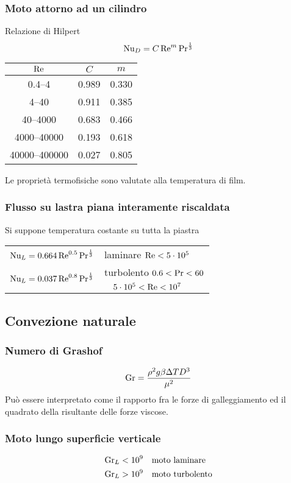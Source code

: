 \subsubsection{Moto attorno ad un cilindro}
Relazione di Hilpert
\[ \operatorname{Nu}_{D} = C \operatorname{Re}^m \operatorname{Pr}^{\frac{1}{3}} \]
\begin{center}
\begin{tabular}{ccc}
    \toprule
    $\operatorname{Re}$ & $C$ & $m$ \\ \midrule
    \numrange{0.4}{4} & 0.989 & 0.330 \\
    \numrange{4}{40} & 0.911 & 0.385 \\
    \numrange{40}{4000} & 0.683 & 0.466 \\
    \numrange{4000}{40000} & 0.193 & 0.618 \\
    \numrange{40000}{400000} & 0.027 & 0.805 \\
    \bottomrule
\end{tabular}
\end{center}
Le proprietà termofisiche sono valutate alla temperatura di film.

\subsubsection{Flusso su lastra piana interamente riscaldata}
Si suppone temperatura costante su tutta la piastra
\begin{tabular}{ll}
$\operatorname{Nu}_{L} = 0.664 \operatorname{Re}^{0.5} \operatorname{Pr}^{\frac{1}{3}}$ & laminare $\operatorname{Re} < 5\cdot10^5$\\
\multirow{2}{*}{$\operatorname{Nu}_{L} = 0.037 \operatorname{Re}^{0.8} \operatorname{Pr}^{\frac{1}{3}}$} & turbolento $0.6 < \operatorname{Pr} < 60$\\
& $\quad 5 \cdot 10^5 < \operatorname{Re} < 10^7$\\
\end{tabular}

\subsection{Convezione naturale}
\subsubsection{Numero di Grashof}
\[  \operatorname{Gr} = \frac{\rho^2 g \beta \Delta T D^3}{\mu^2} \]
Può essere interpretato come il rapporto fra le forze di galleggiamento ed il quadrato della risultante delle forze viscose.
\subsubsection{Moto lungo superficie verticale}
\begin{align*}
    \operatorname{Gr}_{L} < 10^9 & \quad \text{moto laminare} \\
    \operatorname{Gr}_{L} > 10^9 & \quad \text{moto turbolento} \\
\end{align*} 

